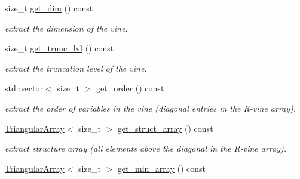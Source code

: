 \begin{DoxyCompactItemize}
\mbox{\label{classvinecopulib_1_1_r_vine_structure_ac2cd2c83b9ffafb9c6563f1923aa1835}} 
size\+\_\+t \hyperlink{classvinecopulib_1_1_r_vine_structure_ac2cd2c83b9ffafb9c6563f1923aa1835}{get\+\_\+dim} () const
\begin{DoxyCompactList}\small\item\em extract the dimension of the vine. \end{DoxyCompactList}\item 
\mbox{\label{classvinecopulib_1_1_r_vine_structure_a6c691b843017f85b7067fcbe0fae55d0}} 
size\+\_\+t \hyperlink{classvinecopulib_1_1_r_vine_structure_a6c691b843017f85b7067fcbe0fae55d0}{get\+\_\+trunc\+\_\+lvl} () const
\begin{DoxyCompactList}\small\item\em extract the truncation level of the vine. \end{DoxyCompactList}\item 
\mbox{\label{classvinecopulib_1_1_r_vine_structure_aed7d73a5bf50b95a6166f42e0f8df9a9}} 
std\+::vector$<$ size\+\_\+t $>$ \hyperlink{classvinecopulib_1_1_r_vine_structure_aed7d73a5bf50b95a6166f42e0f8df9a9}{get\+\_\+order} () const
\begin{DoxyCompactList}\small\item\em extract the order of variables in the vine (diagonal entries in the R-\/vine array). \end{DoxyCompactList}\item 
\mbox{\label{classvinecopulib_1_1_r_vine_structure_a1f04ff64c8cf56fa32173ed0fccbbe46}} 
\hyperlink{classvinecopulib_1_1_triangular_array}{Triangular\+Array}$<$ size\+\_\+t $>$ \hyperlink{classvinecopulib_1_1_r_vine_structure_a1f04ff64c8cf56fa32173ed0fccbbe46}{get\+\_\+struct\+\_\+array} () const
\begin{DoxyCompactList}\small\item\em extract structure array (all elements above the diagonal in the R-\/vine array). \end{DoxyCompactList}\item 
\hyperlink{classvinecopulib_1_1_triangular_array}{Triangular\+Array}$<$ size\+\_\+t $>$ \hyperlink{classvinecopulib_1_1_r_vine_structure_aaebebea9982629eb81223d18b0b9d905}{get\+\_\+min\+\_\+array} () const

\end{DoxyCompactItemize}
